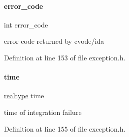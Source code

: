 \paragraph{\texorpdfstring{error\_code}{error\_code}}
{\footnotesize\ttfamily int error\+\_\+code}

error code returned by cvode/ida 

Definition at line 153 of file exception.\+h.

\mbox{\label{classamici_1_1_integration_failure_a6dcdb92539544d894bdc153b3ba8bea6}} 
\paragraph{\texorpdfstring{time}{time}}
{\footnotesize\ttfamily \mbox{\hyperlink{namespaceamici_a1bdce28051d6a53868f7ccbf5f2c14a3}{realtype}} time}

time of integration failure 

Definition at line 155 of file exception.\+h.

